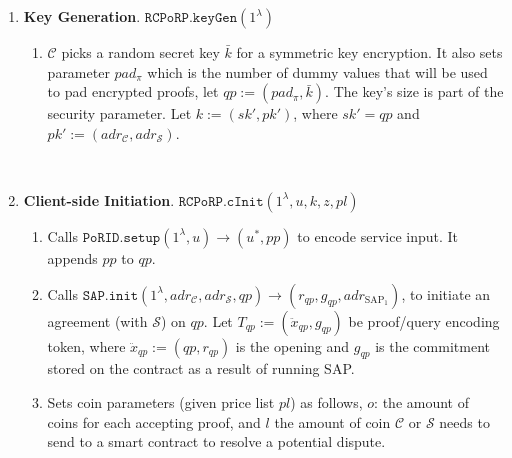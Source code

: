 \begin{enumerate}
\item \textbf{Key Generation}. $\mathtt{RCPoRP}.\mathtt{keyGen}(1^{\scriptscriptstyle\lambda})$
\begin{enumerate}

\item  $\mathcal C$  picks a random secret key  $\bar{k}$ for a symmetric key encryption. It also sets  parameter $pad_{\scriptscriptstyle \pi}$ which is the number of  dummy values that will be used to pad encrypted proofs,  let $qp:=(pad_{\scriptscriptstyle \pi}, \bar{k})$. The key's size is part of the security parameter. Let  ${k}:=(sk',pk')$, where  $sk'=qp$ and $pk':=(adr_{\scriptscriptstyle\mathcal{C}},adr_{\scriptscriptstyle\mathcal{S}})$. 






\end{enumerate}

\

\item \textbf{Client-side Initiation}. $\mathtt{RCPoRP}.\mathtt{cInit}(1^\lambda, u,{k}, z,pl)$
\begin{enumerate}

\item Calls $\mathtt{PoRID.setup}(1^{\lambda}, u)\rightarrow (u^{\scriptscriptstyle *},pp)$ to encode service input. It appends $pp$ to $qp$.


\item  Calls $\mathtt{SAP.init}(1^{\scriptscriptstyle\lambda}, adr_{\scriptscriptstyle\mathcal{C}}, adr_{\scriptscriptstyle\mathcal{S}},qp )\rightarrow(r_{\scriptscriptstyle qp}, g_{\scriptscriptstyle qp}, adr_{\scriptscriptstyle\text{SAP}_{\scriptscriptstyle 1}})$, to initiate an agreement (with $\mathcal{S}$) on $qp$.  Let $T_{\scriptscriptstyle qp}:=(\ddot{x}_{\scriptscriptstyle qp}, g_{\scriptscriptstyle qp})$ be proof/query encoding token,  where  $\ddot{x}_{\scriptscriptstyle qp}:=(qp,r_{\scriptscriptstyle qp})$ is the opening and $g_{\scriptscriptstyle qp}$ is the commitment stored on the contract as a result of running   SAP. 


\item   Sets coin parameters (given  price list $pl$) as  follows,  $o$: the amount of coins for each accepting proof,  and $l$ the amount of coin $\mathcal C$  or $\mathcal S$ needs to send to a smart contract to resolve a potential dispute. 



\end{enumerate}
\end{enumerate}
